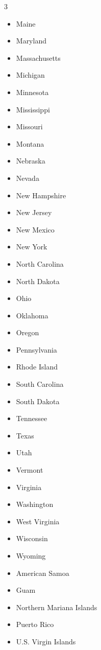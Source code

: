 \documentclass[11pt]{article}
\begin{document}
\begin{enumerate}
\begin{multicols}{3}
\begin{itemize}
\item Maine
\item Maryland
\item Massachusetts
\item Michigan
\item Minnesota
\item Mississippi
\item Missouri
\item Montana
\item Nebraska
\item Nevada
\item New Hampshire
\item New Jersey
\item New Mexico
\item New York
\item North Carolina
\item North Dakota
\item Ohio
\item Oklahoma
\item Oregon
\item Pennsylvania
\item Rhode Island
\item South Carolina
\item South Dakota
\item Tennessee
\item Texas
\item Utah
\item Vermont
\item Virginia
\item Washington
\item West Virginia
\item Wisconsin
\item Wyoming
\item American Samoa
\item Guam
\item Northern Mariana Islands
\item Puerto Rico
\item U.S. Virgin Islands
\end{itemize}
\end{multicols}
    


\end{enumerate}
\end{document}
